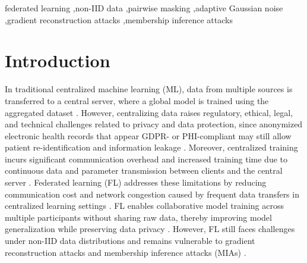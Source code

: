 \documentclass[a4paper,fleqn]{cas-dc}
\begin{document}
\begin{keywords}
federated learning \sep non-IID data \sep pairwise masking \sep adaptive Gaussian noise \sep gradient reconstruction attacks \sep membership inference attacks
\end{keywords}

\maketitle

\section{Introduction}
\label{sec:1}

In traditional centralized machine learning (ML), data from multiple sources is transferred to a central server, where a global model is trained using the aggregated dataset \citep{majeed2022comparative}. However, centralizing data raises regulatory, ethical, legal, and technical challenges related to privacy and data protection, since anonymized electronic health records that appear GDPR- or PHI-compliant may still allow patient re-identification and information leakage \citep{rieke2020future}. Moreover, centralized training incurs significant communication overhead and increased training time due to continuous data and parameter transmission between clients and the central server \citep{thangavel2023distributed}. Federated learning (FL) addresses these limitations by reducing communication cost and network congestion caused by frequent data transfers in centralized learning settings \citep{mcmahan2017communication}. FL enables collaborative model training across multiple participants without sharing raw data, thereby improving model generalization while preserving data privacy \citep{mammen2021federated}. However, FL still faces challenges under non-IID data distributions \citep{xiong2021privacy} and remains vulnerable to gradient reconstruction attacks \citep{guo2025exploring} and membership inference attacks (MIAs) \citep{bai2024membership}.
\end{document}
